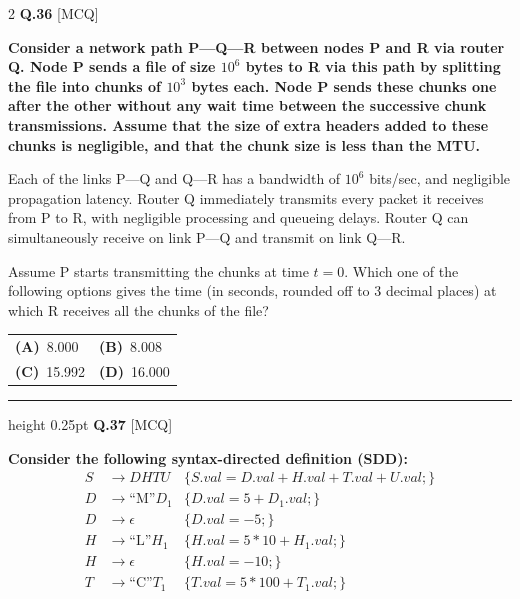 \documentclass[a4paper,10pt,twoside]{article}
\begin{document}
\begin{multicols}{2}
\noindent\textbf{Q.36} \hfill {\footnotesize\textsf{[MCQ]}}
\par\vspace{2pt}
{\bfseries Consider a network path P---Q---R between nodes P and R via router Q. Node P sends a file of size $10^6$ bytes to R via this path by splitting the file into chunks of $10^3$ bytes each. Node P sends these chunks one after the other without any wait time between the successive chunk transmissions. Assume that the size of extra headers added to these chunks is negligible, and that the chunk size is less than the MTU.
\par\smallskip
Each of the links P---Q and Q---R has a bandwidth of $10^6$ bits/sec, and negligible propagation latency. Router Q immediately transmits every packet it receives from P to R, with negligible processing and queueing delays. Router Q can simultaneously receive on link P---Q and transmit on link Q---R.
\par\smallskip
Assume P starts transmitting the chunks at time $t = 0$.
Which one of the following options gives the time (in seconds, rounded off to 3 decimal places) at which R receives all the chunks of the file? \par}
\par\vspace{2pt}\noindent
\begin{tabular*}{\columnwidth}{@{\extracolsep{\fill}}p{}p{}@{}}
\textbf{(A)}~8.000 & \textbf{(B)}~8.008 \\
\addlinespace[2pt]
\textbf{(C)}~15.992 & \textbf{(D)}~16.000
\end{tabular*}
\par\vspace{6pt}\hrule height 0.25pt\vspace{6pt}
\noindent\textbf{Q.37} \hfill {\footnotesize\textsf{[MCQ]}}
\par\vspace{2pt}
{\bfseries Consider the following syntax-directed definition (SDD):
\begin{align*}
S &\to DHTU & \{ S.val = D.val + H.val + T.val + U.val; \} \\
D &\to \text{``M''} D_1 & \{ D.val = 5 + D_1.val; \} \\
D &\to \epsilon & \{ D.val = -5; \} \\
H &\to \text{``L''} H_1 & \{ H.val = 5 * 10 + H_1.val; \} \\
H &\to \epsilon & \{ H.val = -10; \} \\
T &\to \text{``C''} T_1 & \{ T.val = 5 * 100 + T_1.val; \} \\

\end{align*}}
\end{multicols}
\end{document}
